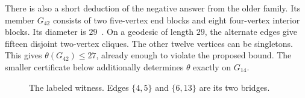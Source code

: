 \documentclass[11pt]{article}
\begin{document}
There is also a short deduction of the negative answer from the older family.
Its member $G_{42}$ consists of two five-vertex end blocks and eight
four-vertex interior blocks. Its diameter is $29$~\cite{brand}.
On a geodesic of length $29$, the alternate edges give fifteen disjoint
two-vertex cliques. The other twelve vertices can be singletons.
This gives $\theta(G_{42})\leq27$, already enough to violate the proposed
bound. The smaller certificate below additionally determines $\theta$
exactly on $G_{14}$.

\begin{figure}[ht]
\centering
{}
\caption{The labeled witness. Edges $\{4,5\}$ and $\{6,13\}$ are its two bridges.}
\label{fig:graph}
\end{figure}
\end{document}
